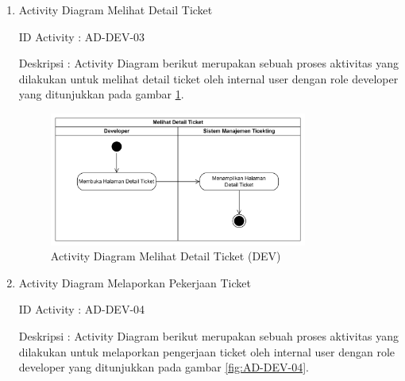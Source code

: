 \documentclass[12pt]{article}
\begin{document}
\begin{enumerate}[label=\textbf{4.\arabic*.}]
\begin{enumerate} [label=\textbf{4.2.\arabic*.}, wide, labelwidth=!, labelindent=0pt]
\begin{enumerate}[label=\textbf{4.2.1.\arabic*.}, wide, labelwidth=!, labelindent=0pt]
\begin{enumerate}[label=\arabic*.]
                \item Activity Diagram Melihat Detail Ticket

                \noindent ID Activity	: AD-DEV-03

                \noindent Deskripsi	: Activity Diagram berikut merupakan sebuah proses aktivitas yang dilakukan untuk melihat detail ticket oleh internal user dengan role developer yang ditunjukkan pada gambar \ref{fig:AD-DEV-03}.


                \begin{figure}[H]
                    \centering \includegraphics[width=0.8\textwidth]{images/activity/idev/Melihat Detail Ticket.png}
                    \caption{Activity Diagram Melihat Detail Ticket (DEV)}
                    \label{fig:AD-DEV-03}
                \end{figure}

                \item Activity Diagram Melaporkan Pekerjaan Ticket

                \noindent ID Activity	: AD-DEV-04

                \noindent Deskripsi	: Activity Diagram berikut merupakan sebuah proses aktivitas yang dilakukan untuk melaporkan pengerjaan ticket oleh internal user dengan role developer yang ditunjukkan pada gambar \ref{fig:AD-DEV-04}.



\end{enumerate}
\end{enumerate}
\end{enumerate}
\end{enumerate}
\end{document}
